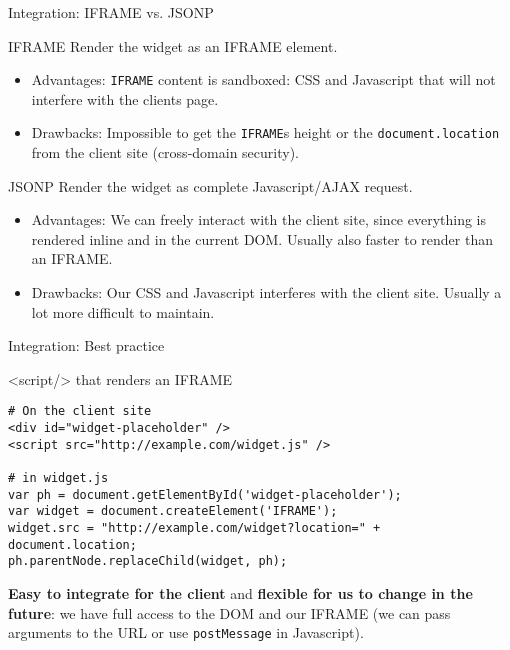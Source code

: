 \documentclass{beamer}
\begin{document}
\begin{frame}{Integration: IFRAME vs. JSONP}

\begin{block}{IFRAME}
Render the widget as an IFRAME element.
\begin{itemize}
  \item Advantages: \lstinline{IFRAME} content is sandboxed: CSS and Javascript that will not interfere with the clients page.
  \item Drawbacks: Impossible to get the \lstinline{IFRAME}s height or the \lstinline{document.location} from the client site (cross-domain security).
\end{itemize}
\end{block}

\begin{block}{JSONP}
  Render the widget as complete Javascript/AJAX request.
  \begin{itemize}
    \item Advantages: We can freely interact with the client site, since everything is rendered inline and in the current DOM. Usually also faster to render than an IFRAME.
    \item Drawbacks: Our CSS and Javascript interferes with the client site. Usually a lot more difficult to maintain.
  \end{itemize}
\end{block}

\end{frame}


\begin{frame}[fragile]{Integration: Best practice}

\begin{block}{<script/> that renders an IFRAME}
  \begin{lstlisting}
# On the client site
<div id="widget-placeholder" />
<script src="http://example.com/widget.js" />

# in widget.js
var ph = document.getElementById('widget-placeholder');
var widget = document.createElement('IFRAME');
widget.src = "http://example.com/widget?location=" + document.location;
ph.parentNode.replaceChild(widget, ph);
  \end{lstlisting}
  \textbf{Easy to integrate for the client} and \textbf{flexible for us to change in the future}: we have full access to the DOM and our IFRAME (we can pass arguments to the URL or use \lstinline{postMessage} in Javascript).
\end{block}

\end{frame}
\end{document}
